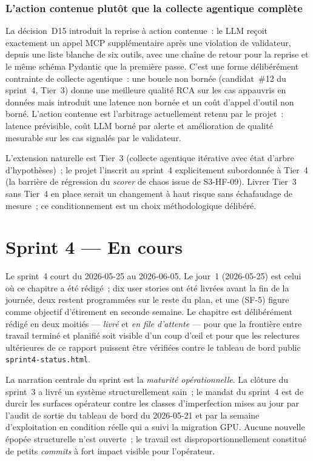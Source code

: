 \documentclass[11pt,a4paper,oneside]{report}
\begin{document}
\subsection{L'action contenue plutôt que la collecte agentique complète}

La décision~D15 introduit la reprise à action contenue~: le LLM
reçoit exactement un appel MCP supplémentaire après une violation
de validateur, depuis une liste blanche de six outils, avec une
chaîne de retour pour la reprise et le même schéma Pydantic que la
première passe. C'est une forme délibérément contrainte de collecte
agentique~: une boucle non bornée (candidat~\#12 du sprint~4,
Tier~3) donne une meilleure qualité RCA sur les cas appauvris en
données mais introduit une latence non bornée et un coût d'appel
d'outil non borné. L'action contenue est l'arbitrage actuellement
retenu par le projet~: latence prévisible, coût LLM borné par
alerte et amélioration de qualité mesurable sur les cas signalés
par le validateur.

L'extension naturelle est Tier~3 (collecte agentique itérative avec
état d'arbre d'hypothèses)~; le projet l'inscrit au sprint~4
explicitement subordonnée à Tier~4 (la barrière de régression du
\emph{scorer} de chaos issue de S3-HF-09). Livrer Tier~3 sans
Tier~4 en place serait un changement à haut risque sans
échafaudage de mesure~; ce conditionnement est un choix
méthodologique délibéré.

\chapter{Sprint 4 --- En cours}
\label{ch:sprint4}

Le sprint~4 court du 2026-05-25 au 2026-06-05. Le jour~1
(2026-05-25) est celui où ce chapitre a été rédigé~; dix user
stories ont été livrées avant la fin de la journée, deux restent
programmées sur le reste du plan, et une (SF-5) figure comme
objectif d'étirement en seconde semaine. Le chapitre est
délibérément rédigé en deux moitiés --- \emph{livré} et
\emph{en file d'attente} --- pour que la frontière entre travail
terminé et planifié soit visible d'un coup d'\oe{}il et pour que les
relectures ultérieures de ce rapport puissent être vérifiées
contre le tableau de bord public \texttt{sprint4-status.html}.

La narration centrale du sprint est la \emph{maturité opérationnelle}.
La clôture du sprint~3 a livré un système structurellement sain~; le
mandat du sprint~4 est de durcir les surfaces opérateur contre les
classes d'imperfection mises au jour par l'audit de sortie du
tableau de bord du 2026-05-21 et par la semaine d'exploitation en
condition réelle qui a suivi la migration GPU. Aucune nouvelle
épopée structurelle n'est ouverte~; le travail est
disproportionnellement constitué de petits \emph{commits} à fort
impact visible pour l'opérateur.
\end{document}
